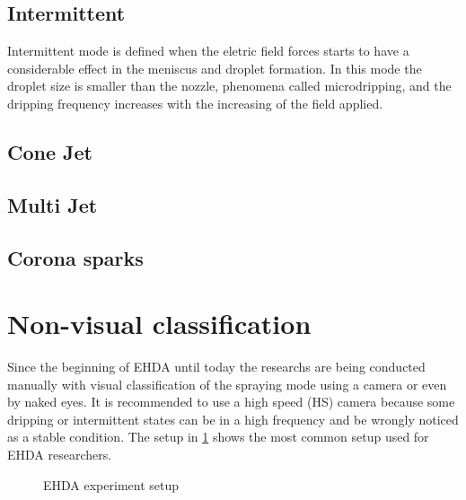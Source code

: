 \subsection{Intermittent}
\label{subsec:Intermittent}

Intermittent mode is defined when the eletric field forces starts to have a considerable effect in the meniscus and droplet formation. 
In this mode the droplet size is smaller than the nozzle, phenomena called microdripping, and the dripping frequency increases with the increasing of the field applied.

\subsection{Cone Jet}
\label{subsec:Cone Jet}

\subsection{Multi Jet}
\label{subsec:Multi Jet}

\subsection{Corona sparks}
\label{subsec:Corona sparks}


\section{Non-visual classification}
\label{sec:non-visual-classification}

Since the beginning of EHDA until today the researchs are being conducted manually with visual classification of the spraying mode using a camera or even by naked eyes.
It is recommended to use a high speed (HS) camera because some dripping or intermittent states can be in a high frequency and be wrongly noticed as a stable condition.
The setup in \ref{fig:ehda_setup} shows the most common setup used for EHDA researchers.

\begin{figure}[H]
  \centering
  \caption{EHDA experiment setup \cite{Luewton}}
  \label{fig:ehda_setup}
\end{figure}



